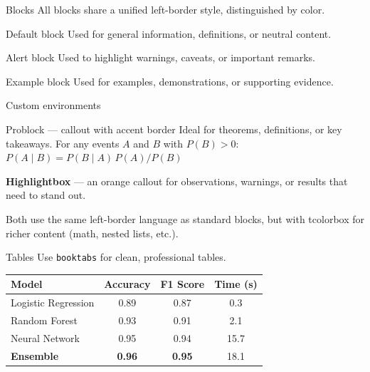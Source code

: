 \documentclass[aspectratio=169]{beamer}
\begin{document}
\begin{frame}{Blocks}
    All blocks share a unified left-border style, distinguished by color.

    \begin{block}{Default block}
        Used for general information, definitions, or neutral content.
    \end{block}

    \begin{alertblock}{Alert block}
        Used to highlight warnings, caveats, or important remarks.
    \end{alertblock}

    \begin{exampleblock}{Example block}
        Used for examples, demonstrations, or supporting evidence.
    \end{exampleblock}
\end{frame}

\begin{frame}{Custom environments}
    \begin{problock}{Problock --- callout with accent border}
        Ideal for theorems, definitions, or key takeaways.
        For any events $A$ and $B$ with $P(B) > 0$:\;
        $P(A \mid B) = {P(B \mid A)\, P(A)}/{P(B)}$
    \end{problock}

    \begin{highlightbox}
        \textbf{Highlightbox} --- an orange callout for observations,
        warnings, or results that need to stand out.
    \end{highlightbox}

    \vspace{0.2cm}
    Both use the same left-border language as standard blocks,
    but with tcolorbox for richer content (math, nested lists, etc.).
\end{frame}

\begin{frame}{Tables}
    Use \texttt{booktabs} for clean, professional tables.

    \vspace{0.4cm}
    \centering
    \begin{tabular}{lccc}
        \toprule
        \textbf{Model} & \textbf{Accuracy} & \textbf{F1 Score} &
        \textbf{Time (s)} \\
        \midrule
        Logistic Regression & 0.89 & 0.87 & 0.3 \\
        Random Forest       & 0.93 & 0.91 & 2.1 \\
        Neural Network      & 0.95 & 0.94 & 15.7 \\
        \textbf{Ensemble}   & \textbf{0.96} & \textbf{0.95} & 18.1 \\
        \bottomrule
    \end{tabular}
\end{frame}
\end{document}
